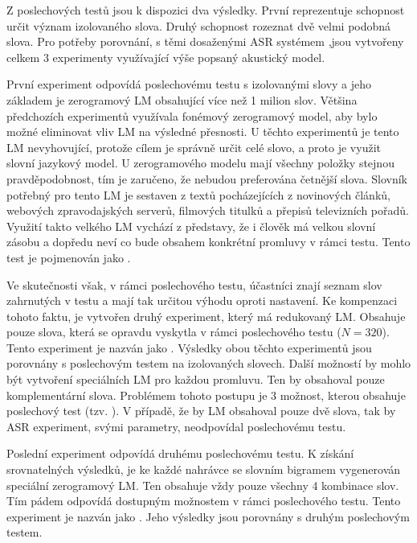 Z poslechových testů jsou k dispozici dva výsledky. První reprezentuje schopnost určit význam izolovaného slova. Druhý schopnost rozeznat dvě velmi podobná slova. Pro potřeby porovnání, s těmi dosaženými ASR systémem ,jsou vytvořeny celkem $3$ experimenty využívající výše popsaný akustický model.

První experiment odpovídá poslechovému testu s izolovanými slovy a jeho základem je zerogramový LM obsahující více než 1 milion slov. Většina předchozích experimentů využívala fonémový zerogramový model, aby bylo možné eliminovat vliv LM na výsledné přesnosti. U těchto experimentů je tento LM nevyhovující, protože cílem je správně určit celé slovo, a proto je využit slovní jazykový model. U zerogramového modelu mají všechny položky stejnou pravděpodobnost, tím je zaručeno, že nebudou preferována četnější slova. Slovník potřebný pro tento LM je sestaven z textů pocházejících z novinových článků, webových zpravodajských serverů, filmových titulků a přepisů televizních pořadů. Využití takto velkého LM vychází z představy, že i člověk má velkou slovní zásobu a dopředu neví co bude obsahem konkrétní promluvy v rámci testu. Tento test je pojmenován jako .

Ve skutečnosti však, v rámci poslechového testu, účastníci znají seznam slov zahrnutých v testu a mají tak určitou výhodu oproti  nastavení. Ke kompenzaci tohoto faktu, je vytvořen druhý experiment, který má redukovaný LM. Obsahuje pouze slova, která se opravdu vyskytla v rámci poslechového testu ($N = 320$). Tento experiment je nazván jako . Výsledky obou těchto experimentů jsou porovnány s poslechovým testem na izolovaných slovech. Další možností by mohlo být vytvoření speciálních LM pro každou promluvu. Ten by obsahoval pouze komplementární slova. Problémem tohoto postupu je 3 možnost, kterou obsahuje poslechový test (tzv. ). V případě, že by LM obsahoval pouze dvě slova, tak by ASR experiment, svými parametry, neodpovídal poslechovému testu.

Poslední experiment odpovídá druhému poslechovému testu. K získání srovnatelných výsledků, je ke každé nahrávce se slovním bigramem vygenerován speciální zerogramový LM. Ten obsahuje vždy pouze všechny 4 kombinace slov. Tím pádem odpovídá dostupným možnostem v rámci poslechového testu. Tento experiment je nazván jako . Jeho výsledky jsou porovnány s druhým poslechovým testem.

